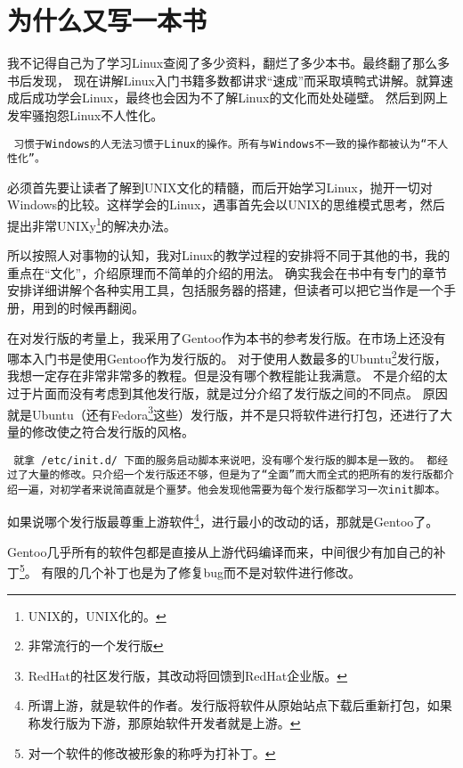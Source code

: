 \documentclass[amstex]{ctexbook}
\newenvironment{notice}{\tt}{}
\begin{document}
\section{为什么又写一本书}

我不记得自己为了学习Linux查阅了多少资料，翻烂了多少本书。最终翻了那么多书后发现，
现在讲解Linux入门书籍多数都讲求“速成”而采取填鸭式讲解。就算速成后成功学会Linux，最终也会因为不了解Linux的文化而处处碰壁。
然后到网上发牢骚抱怨Linux不人性化。

\begin{notice}
习惯于Windows的人无法习惯于Linux的操作。所有与Windows不一致的操作都被认为“不人性化”。
\end{notice}

必须首先要让读者了解到UNIX文化的精髓，而后开始学习Linux，抛开一切对Windows的比较。这样学会的Linux，遇事首先会以UNIX的思维模式思考，然后提出非常UNIXy\footnote{UNIX的，UNIX化的。}的解决办法。

所以按照人对事物的认知，我对Linux的教学过程的安排将不同于其他的书，我的重点在“文化”，介绍原理而不简单的介绍的用法。
确实我会在书中有专门的章节安排详细讲解个各种实用工具，包括服务器的搭建，但读者可以把它当作是一个手册，用到的时候再翻阅。

在对发行版的考量上，我采用了Gentoo作为本书的参考发行版。在市场上还没有哪本入门书是使用Gentoo作为发行版的。
对于使用人数最多的Ubuntu\footnote{非常流行的一个发行版}发行版，我想一定存在非常非常多的教程。但是没有哪个教程能让我满意。
不是介绍的太过于片面而没有考虑到其他发行版，就是过分介绍了发行版之间的不同点。
原因就是Ubuntu（还有Fedora\footnote{RedHat的社区发行版，其改动将回馈到RedHat企业版。}这些）发行版，并不是只将软件进行打包，还进行了大量的修改使之符合发行版的风格。

\begin{notice}
就拿 /etc/init.d/ 下面的服务启动脚本来说吧，没有哪个发行版的脚本是一致的。
都经过了大量的修改。只介绍一个发行版还不够，但是为了“全面”而大而全式的把所有的发行版都介绍一遍，对初学者来说简直就是个噩梦。他会发现他需要为每个发行版都学习一次init脚本。
\end{notice}

如果说哪个发行版最尊重上游软件\footnote{所谓上游，就是软件的作者。发行版将软件从原始站点下载后重新打包，如果称发行版为下游，那原始软件开发者就是上游。}，进行最小的改动的话，那就是Gentoo了。

Gentoo几乎所有的软件包都是直接从上游代码编译而来，中间很少有加自己的补丁\footnote{对一个软件的修改被形象的称呼为打补丁。}。
有限的几个补丁也是为了修复bug而不是对软件进行修改。
\end{document}
